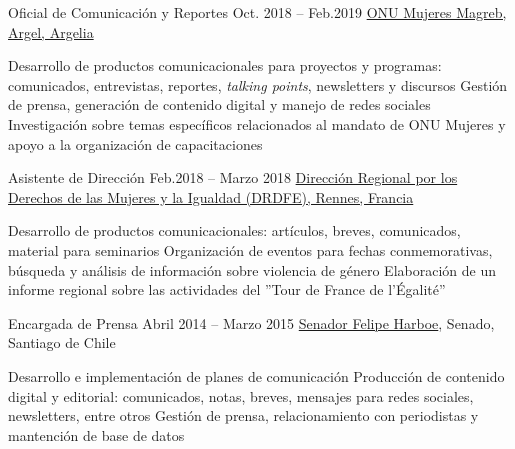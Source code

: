 \begin{joblist}[13.2][7.8][3.9]

\item[Oficial de Comunicación y Reportes]{Oct. 2018 -- Feb.2019 }
    {
    \href{http://maghreb.unwomen.org/fr}{ONU Mujeres Magreb, Argel, Argelia}
    }
    {
        \vspace{-0.5cm}
        \begin{itemize}
            \iftbftiny \setlength\itemsep{-3pt} \fi
            \cvitem[\checkmark] Desarrollo de productos comunicacionales para proyectos y programas: comunicados, entrevistas, reportes, {\textit{talking points}}, newsletters y discursos
            \cvitem[\checkmark] Gestión de prensa, generación de contenido digital y manejo de redes sociales
            \cvitem[\checkmark] Investigación sobre temas específicos relacionados al mandato de ONU Mujeres y apoyo a la organización de capacitaciones
            
        \end{itemize}
    }


\item[Asistente de Dirección]{Feb.2018 -- Marzo 2018 }
    {
    \href{https://www.egalite-femmes-hommes.gouv.fr/le-secretariat-d-etat/organisation-du-ministere/services-territoriaux/annuaire-des-equipes-regionales-et-departementales/}{Dirección Regional por los Derechos de las Mujeres y la Igualdad (DRDFE), Rennes, Francia}
    }
    {
        \iftbftiny \vspace{-0.5cm} \fi
        \begin{itemize}
            \iftbftiny \setlength\itemsep{-3pt} \fi
            \cvitem[\checkmark] Desarrollo de productos comunicacionales: artículos, breves, comunicados, material para seminarios
            \cvitem[\checkmark] Organización de eventos para fechas conmemorativas, búsqueda y análisis de información sobre violencia de género
            \cvitem[\checkmark] Elaboración de un informe regional sobre las actividades del ''Tour de France de l'Égalité''
        \end{itemize}
    }



\item[Encargada de Prensa]{Abril 2014 -- Marzo 2015}
    {
    \href{https://www.harboe.cl/}{Senador Felipe Harboe}, Senado, Santiago de Chile
    }
    {
        \iftbftiny \vspace{-0.5cm} \fi
        \begin{itemize}
            \iftbftiny \setlength\itemsep{-3pt} \fi
            \cvitem[\checkmark] Desarrollo e implementación de planes de comunicación 
            \cvitem[\checkmark] Producción de contenido digital y editorial: comunicados, notas, breves, mensajes para redes sociales, newsletters, entre otros
            \cvitem[\checkmark] Gestión de prensa, relacionamiento con periodistas y mantención de base de datos
            

\end{itemize}}
\end{joblist}
